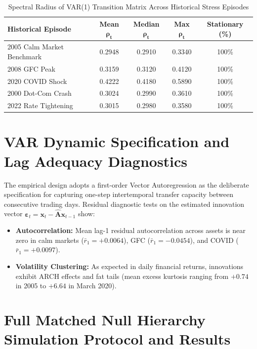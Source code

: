 \documentclass[12pt]{article}
\begin{document}
\begin{table}[htbp]
\centering
\caption{Spectral Radius of VAR(1) Transition Matrix Across Historical Stress Episodes}
\label{tab:app_spectral_radius}
\begin{tabular}{lcccc}
\toprule
\textbf{Historical Episode} & \textbf{Mean } $\mathbf{\rho_t}$ & \textbf{Median } $\mathbf{\rho_t}$ & \textbf{Max } $\mathbf{\rho_t}$ & \textbf{Stationary (\%)} \\
\midrule
2005 Calm Market Benchmark  & 0.2948 & 0.2910 & 0.3340 & 100\% \\
2008 GFC Peak               & 0.3159 & 0.3120 & 0.4120 & 100\% \\
2020 COVID Shock            & 0.4222 & 0.4180 & 0.5890 & 100\% \\
2000 Dot-Com Crash          & 0.3024 & 0.2990 & 0.3610 & 100\% \\
2022 Rate Tightening        & 0.3015 & 0.2980 & 0.3580 & 100\% \\
\bottomrule
\end{tabular}
\end{table}

\section{VAR Dynamic Specification and Lag Adequacy Diagnostics}
\label{app:var_lag_order}

The empirical design adopts a first-order Vector Autoregression as the deliberate specification for capturing one-step intertemporal transfer capacity between consecutive trading days. Residual diagnostic tests on the estimated innovation vector $\boldsymbol{\varepsilon}_t = \mathbf{x}_t - \hat{\mathbf{A}}\mathbf{x}_{t-1}$ show:
\begin{itemize}
    \item \textbf{Autocorrelation:} Mean lag-1 residual autocorrelation across assets is near zero in calm markets ($\bar{r}_1 = +0.0064$), GFC ($\bar{r}_1 = -0.0454$), and COVID ($\bar{r}_1 = +0.0097$).
    \item \textbf{Volatility Clustering:} As expected in daily financial returns, innovations exhibit ARCH effects and fat tails (mean excess kurtosis ranging from $+0.74$ in 2005 to $+6.64$ in March 2020).
\end{itemize}

\section{Full Matched Null Hierarchy Simulation Protocol and Results}
\label{app:null_protocol}
\end{document}
